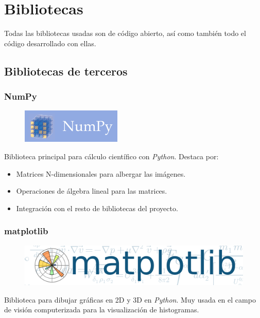 \chapter{Bibliotecas}
Todas las bibliotecas usadas son de código abierto, así
como también todo el código desarrollado con ellas.

\section{Bibliotecas de terceros}
\subsection{NumPy}
\begin{figure}[H]
  \includegraphics[scale=0.5]{imagenes/logos/numpy_logo.png}
\end{figure}
Biblioteca principal para cálculo científico con
\emph{Python}. Destaca por:
\begin{itemize}
\item Matrices N-dimensionales para albergar las imágenes.
\item Operaciones de álgebra lineal para las matrices.
\item Integración con el resto de bibliotecas del proyecto.
\end{itemize}

\subsection{matplotlib}
\begin{figure}[H]
  \includegraphics[scale=0.2]{imagenes/logos/matplotlib_logo.png}
\end{figure}
Biblioteca para dibujar gráficas en 2D y 3D en \emph{Python}. Muy
usada en el campo de visión computerizada para la visualización de
histogramas.
\vfill

